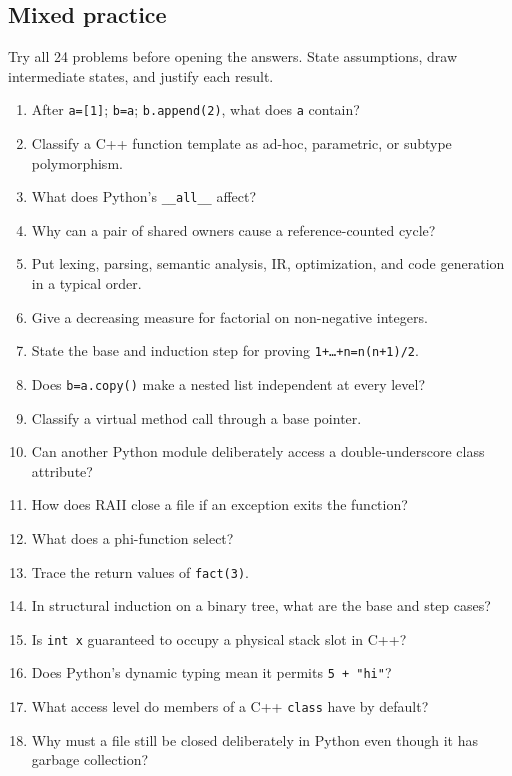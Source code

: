 \documentclass[11pt]{article}
\begin{document}
\clearpage

\begin{keepsection}
\section{Mixed practice}

Try all 24 problems before opening the answers. State assumptions, draw intermediate states, and justify each result.

\begin{enumerate}
\item After \texttt{a=[1]}; \texttt{b=a}; \texttt{b.append(2)}, what does \texttt{a} contain?
\item Classify a C++ function template as ad-hoc, parametric, or subtype polymorphism.
\item What does Python’s \texttt{\_\_all\_\_} affect?
\item Why can a pair of shared owners cause a reference-counted cycle?
\item Put lexing, parsing, semantic analysis, IR, optimization, and code generation in a typical order.
\item Give a decreasing measure for factorial on non-negative integers.
\item State the base and induction step for proving \texttt{1+…+n=n(n+1)/2}.
\item Does \texttt{b=a.copy()} make a nested list independent at every level?
\item Classify a virtual method call through a base pointer.
\item Can another Python module deliberately access a double-underscore class attribute?
\item How does RAII close a file if an exception exits the function?
\item What does a phi-function select?
\item Trace the return values of \texttt{fact(3)}.
\item In structural induction on a binary tree, what are the base and step cases?
\item Is \texttt{int x} guaranteed to occupy a physical stack slot in C++?
\item Does Python’s dynamic typing mean it permits \texttt{5 + "hi"}?
\item What access level do members of a C++ \texttt{class} have by default?
\item Why must a file still be closed deliberately in Python even though it has garbage collection?

\end{enumerate}
\end{keepsection}
\end{document}
